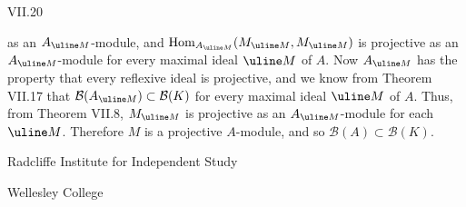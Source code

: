 VII.20

as an $A_{\uline M}$-module, and
$\operatorname{Hom}_{A_{\uline M}}(M_{\uline M},M_{\uline M})$ is projective as an
$A_{\uline M}$-module for every maximal ideal $\uline M$ of $A$. Now $A_{\uline M}$ has the
property that every reflexive ideal is projective, and we know from
Theorem VII.17 that $\mathcal B(A_{\uline M})\subset\mathcal B(K)$ for every maximal ideal $\uline M$
of $A$. Thus, from Theorem VII.8, $M_{\uline M}$ is projective as an
$A_{\uline M}$-module for each $\uline M$. Therefore $M$ is a projective $A$-module,
and so $\mathcal B(A)\subset\mathcal B(K)$.

Radcliffe Institute for Independent Study

Wellesley College
